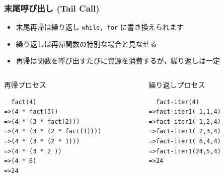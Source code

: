 \begin{frame}[fragile]
\frametitle{末尾呼び出し (Tail Call)}
  \begin{itemize}
\item 末尾再帰は繰り返し {\tt while, for} に書き換えられます
\item 繰り返しは再帰関数の特別な場合と見なせる
\item 再帰は関数を呼び出すたびに資源を消費するが，繰り返しは一定
  \end{itemize}
  \begin{columns}
    \begin{column}{0.5\textwidth}
      \begin{itembox}{再帰プロセス}
\scriptsize
        \begin{verbatim}
  fact(4)
=>(4 * fact(3))
=>(4 * (3 * fact(2)))
=>(4 * (3 * (2 * fact(1))))
=>(4 * (3 * (2 * 1)))
=>(4 * (3 * 2 ))
=>(4 * 6)
=>24
        \end{verbatim}
      \end{itembox}
    \end{column}
    \begin{column}{0.45\textwidth}
      \begin{itembox}{繰り返しプロセス}
\scriptsize
        \begin{verbatim}
  fact-iter(4)
=>fact-iter1( 1,1,4)
=>fact-iter1( 1,2,4)
=>fact-iter1( 2,3,4)
=>fact-iter1( 6,4,4)
=>fact-iter1(24,5,4)
=>24
        \end{verbatim}
      \end{itembox}
    \end{column}
  \end{columns}
\end{frame}
%
%
